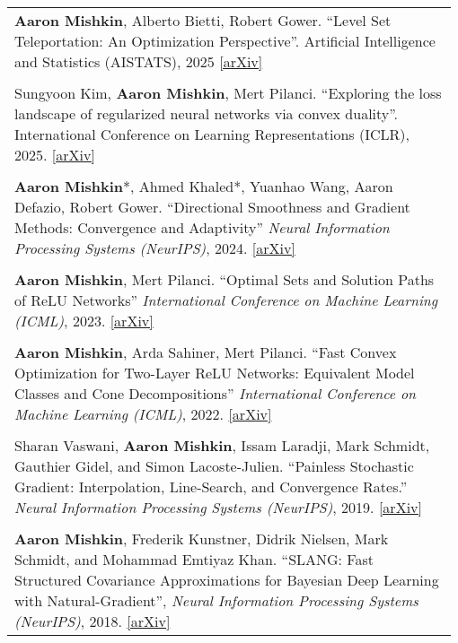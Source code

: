 \documentclass[10pt]{article}
\begin{document}
\begin{longtable}{L{0.98\linewidth}}
    \textbf{Aaron Mishkin}, Alberto Bietti, Robert Gower. ``Level Set Teleportation: An Optimization Perspective''. Artificial Intelligence and Statistics (AISTATS), 2025 \href{https://arxiv.org/abs/2403.03362}{[arXiv]}                                                             \\  \\
    Sungyoon Kim, \textbf{Aaron Mishkin}, Mert Pilanci. ``Exploring the loss landscape of regularized neural networks via convex duality''.
    International Conference on Learning Representations (ICLR), 2025. \href{https://arxiv.org/abs/2411.07729}{[arXiv]}                                                                                                                                                                 \\  \\
    \textbf{Aaron Mishkin}*, Ahmed Khaled*, Yuanhao Wang, Aaron Defazio, Robert Gower. ``Directional Smoothness and Gradient Methods: Convergence and Adaptivity'' \textit{Neural Information Processing Systems (NeurIPS)}, 2024. \href{https://arxiv.org/abs/2403.04081}{[arXiv]}     \\  \\
    \textbf{Aaron Mishkin}, Mert Pilanci. ``Optimal Sets and Solution Paths of ReLU Networks'' \textit{International Conference on Machine Learning (ICML)}, 2023. \href{https://arxiv.org/abs/2306.00119}{[arXiv]}                                                                     \\  \\
    \textbf{Aaron Mishkin}, Arda Sahiner, Mert Pilanci. ``Fast Convex Optimization for Two-Layer ReLU Networks: Equivalent Model Classes and Cone Decompositions'' \textit{International Conference on Machine Learning (ICML)}, 2022. \href{https://arxiv.org/abs/2202.01331}{[arXiv]} \\  \\
    Sharan Vaswani, \textbf{Aaron Mishkin}, Issam Laradji, Mark Schmidt, Gauthier
    Gidel, and Simon Lacoste-Julien.
    ``Painless Stochastic Gradient: Interpolation, Line-Search, and Convergence Rates.'' \textit{Neural Information Processing Systems (NeurIPS)}, 2019. \href{https://arxiv.org/abs/1905.09997}{[arXiv]}                                                                               \\  \\
    \textbf{Aaron Mishkin}, Frederik Kunstner, Didrik Nielsen, Mark Schmidt, and Mohammad Emtiyaz Khan. ``SLANG: Fast Structured Covariance Approximations for Bayesian Deep Learning with Natural-Gradient'', \textit{Neural Information Processing Systems (NeurIPS)}, 2018. \href{https://arxiv.org/abs/1811.04504}{[arXiv]}
\end{longtable}
\end{document}
